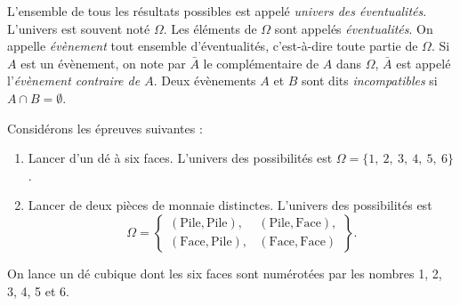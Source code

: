             \begin{defi}
                  L'ensemble de tous les r\'esultats possibles est appel\'e \emph{univers des \'eventualit\'es}.
                  L'univers est souvent not\'e $\Omega$.
                  Les \'el\'ements de $\Omega$ sont appel\'es \emph{\'eventualit\'es}.
                  On appelle \emph{\'ev\`enement} tout ensemble d'\'eventualit\'es, c'est-\`a-dire toute partie de $\Omega$.
                  Si $A$ est un \'ev\`enement, on note par $\bar{A}$ le compl\'ementaire de $A$ dans $\Omega$,
                  $\bar{A}$ est appel\'e l'\emph{\'ev\`enement contraire de $A$}.
                  Deux \'ev\`enements $A$ et $B$ sont dits \emph{incompatibles} si $A\cap B = \emptyset$.
                  \begin{ex}
                        Consid\'erons les \'epreuves suivantes :
                        \begin{enumerate}
                              \item Lancer d'un d\'e \`a six faces.
                                    L'univers des possibilit\'es est 
                                    $\Omega = \{ 1,\ 2,\ 3,\ 4,\ 5,\ 6 \}$.
                              \item Lancer de deux pi\`eces de monnaie distinctes.
                                    L'univers des possibilit\'es est
                                    \[
                                      \Omega = \left\{
                                        \begin{array}{cc}
                                          (\text{Pile},\text{Pile}), & (\text{Pile},\text{Face}), \\
                                          (\text{Face},\text{Pile}), & (\text{Face},\text{Face})
                                        \end{array}
                                      \right\}.
                                    \]
                        \end{enumerate}
                  \end{ex}
                  \begin{ex}
                        On lance un d\'e cubique dont les six faces sont num\'erot\'ees par les nombres 
                        1, 2, 3, 4, 5 et 6.
                        

\end{ex}
\end{defi}
